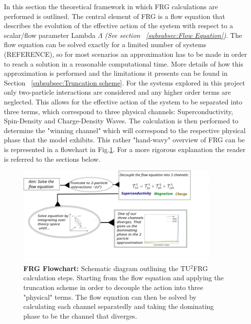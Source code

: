 \documentclass[12pt]{article}
\begin{document}
\medskip

\noindent In this section the theoretical framework in which FRG calculations are performed is outlined. The central element of FRG is a flow equation that describes the evolution of the effective action of the system with respect to a scalar/flow parameter Lambda $\Lambda$ \textit{(See section ~\ref{subsubsec:Flow Equation})}.
The flow equation can be solved exactly for a limited number of systems (REFERENCE), so for most scenarios an approximation has to be made in order to reach a solution in a reasonable computational time. More details of how this approximation is performed and the limitations it presents can be found in Section ~\ref{subsubsec:Truncation scheme}. For the systems explored in this project only two-particle
interactions are considered and any higher order terms are neglected.
This allows for the effective action of the system to be separated into three terms, which correspond to three physical channels: Superconductivity, Spin-Density and Charge-Density Waves.
The calculation is then performed to determine the "winning channel" which will correspond to the respective physical phase that the model exhibits. This rather "hand-wavy" overview of FRG can be is represented in a flowchart in Fig.\ref{fig:FRGflowdiagram}.
For a more rigorous explanation the reader is referred to the sections below. 

\begin{figure}[htbp]  %
    \centering
    \includegraphics[width=0.9\textwidth]{FRGflowdiagram.png}  %
    \caption{\textbf{FRG Flowchart:} Schematic diagram outlining the TU$^2$FRG calculation steps. Starting from the flow equation and applying the truncation scheme in order to decouple the action into three "physical" terms. 
    The flow equation can then be solved by calculating each channel separatedly and taking the dominating phase to be the channel that diverges.}
    \label{fig:FRGflowdiagram}
\end{figure}
\end{document}
